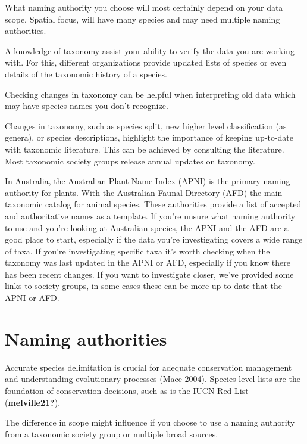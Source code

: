 \documentclass[
  letterpaper,
  DIV=11,
  numbers=noendperiod,
  oneside]{scrreprt}
\begin{document}
What naming authority you choose will most certainly depend on your data
scope. Spatial focus, will have many species and may need multiple
naming authorities.

A knowledge of taxonomy assist your ability to verify the data you are
working with. For this, different organizations provide updated lists of
species or even details of the taxonomic history of a species.

Checking changes in taxonomy can be helpful when interpreting old data
which may have species names you don't recognize.

Changes in taxonomy, such as species split, new higher level
classification (as genera), or species descriptions, highlight the
importance of keeping up-to-date with taxonomic literature. This can be
achieved by consulting the literature. Most taxonomic society groups
release annual updates on taxonomy.

In Australia, the \href{https://www.anbg.gov.au/apni/}{Australian Plant
Name Index (APNI)} is the primary naming authority for plants. With the
\href{https://biodiversity.org.au/afd/home}{Australian Faunal Directory
(AFD)} the main taxonomic catalog for animal species. These authorities
provide a list of accepted and authoritative names as a template. If
you're unsure what naming authority to use and you're looking at
Australian species, the APNI and the AFD are a good place to start,
especially if the data you're investigating covers a wide range of taxa.
If you're investigating specific taxa it's worth checking when the
taxonomy was last updated in the APNI or AFD, especially if you know
there has been recent changes. If you want to investigate closer, we've
provided some links to society groups, in some cases these can be more
up to date that the APNI or AFD.

\hypertarget{naming-authorities-1}{%
\section{Naming authorities}\label{naming-authorities-1}}

Accurate species delimitation is crucial for adequate conservation
management and understanding evolutionary processes (Mace 2004).
Species-level lists are the foundation of conservation decisions, such
as is the IUCN Red List (\textbf{melville21?}).

The difference in scope might influence if you choose to use a naming
authority from a taxonomic society group or multiple broad sources.
\end{document}
